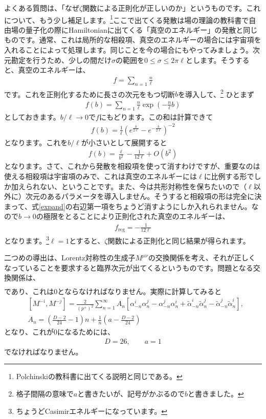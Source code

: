 \documentclass[report,paper=a4, fontsize=12pt, line_length=16cm, number_of_lines=33,dvipdfmx]{jlreq}
\numberwithin{equation}{chapter}
\numberwithin{equation}{section}
\newcommand{\alphat}{\tilde{\alpha}}
\begin{document}
よくある質問は、「なぜ$\zeta$関数による正則化が正しいのか」というものです。これについて、もう少し補足します。\footnote{Polchinskiの教科書に出てくる説明と同じである。}ここで出てくる発散は場の理論の教科書で自由場の量子化の際にHamiltonianに出てくる「真空のエネルギー」の発散と同じものです。通常、これは局所的な相殺項、真空のエネルギーの場合には宇宙項を入れることによって処理します。同じことを今の場合にもやってみましょう。次元勘定を行うため、少しの間だけ$\sigma$の範囲を$0\le \sigma \le 2\pi \ell$とします。そうすると、真空のエネルギーは、
\begin{align}
f=\sum_{n=1}\frac{n}{\ell}
\end{align}
です。これを正則化するために長さの次元をもつ切断$b$を導入して、\footnote{格子間隔の意味で$a$と書きたいが、記号がかぶるので$b$と書きました。}
ひとまず
\begin{align}
f(b)=\sum_{n=1}\frac{n}{\ell} \exp\left(-\frac{n}{\ell} b\right)
\end{align}
としておきます。$b/\ell \to 0$で$f$にもどります。この和は計算できて
\begin{align}
f(b)=\frac{1}{\ell}(e^{\frac{b}{2\ell}}-e^{-\frac{b}{2\ell}})^{-2}
\end{align}
となります。これを$b/\ell$が小さいとして展開すると
\begin{align}
f(b)=\frac{\ell}{b^2}-\frac{1}{12\ell}+O(b^2)\label{expand}
\end{align}
となります。さて、これから発散を相殺項を使って消すわけですが、重要なのは使える相殺項は宇宙項のみで、これは真空のエネルギーには$\ell$に比例する形でしか加えられない、ということです。また、今は共形対称性を保ちたいので（$\ell$以外に）次元のあるパラメータを導入しません。そうすると相殺項の形は完全に決まって、式\eqref{expand}の右辺第一項をちょうど消すようにしか入れられません。なので$b\to 0$の極限をとることにより正則化された真空のエネルギーは、
\begin{align}
f_{\mathrm{reg}}=-\frac{1}{12\ell}
\end{align}
となります。\footnote{ちょうどCasimirエネルギーになっています。}$\ell=1$とすると、$\zeta$関数による正則化と同じ結果が得られます。

二つめの導出は、Lorentz対称性の生成子$M^{\mu\nu}$の交換関係を考え、それが正しくなっていることを要求すると臨界次元が出てくるというものです。問題となる交換関係は、
\begin{align}
[M^{-i},M^{-j}]
\end{align}
であり、これは$0$とならなければなりません。実際に計算してみると
\begin{align}
&[M^{-i},M^{-j}]=\frac{2}{(p^{+})^2}\sum_{n=1}^{\infty}A_{n}
\left[
\alpha_{-n}^i\alpha_{n}^j
-\alpha_{-n}^j\alpha_{n}^i
+\alphat_{-n}^i\alphat_{n}^j
-\alphat_{-n}^j\alphat_{n}^i
\right],\nonumber\\
&A_n=\left(\frac{D-2}{24}-1\right)n+
\frac{1}{n}\left(a-\frac{D-2}{24}\right)
\end{align}
となり、これが$0$になるためには、
\begin{align}
D=26,\qquad a=1
\end{align}
でなければなりません。
\end{document}
